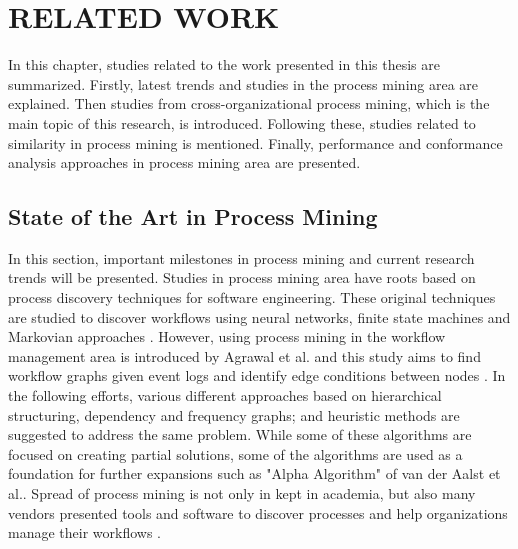 \chapter{RELATED WORK}
\label{chp:relatedwork}

In this chapter, studies related to the work presented in this thesis are summarized. Firstly, latest trends and studies in the process mining area are explained. Then studies from cross-organizational process mining, which is the main topic of this research, is introduced. Following these, studies related to similarity in process mining is mentioned. Finally, performance and conformance analysis approaches in process mining area are presented.

\section{State of the Art in Process Mining}
\label{sec:state-of-the-art-in-process-mining}

In this section, important milestones in process mining and current research trends will be presented. Studies in process mining area have roots based on process discovery techniques for software engineering. These original techniques are studied to discover workflows using neural networks, finite state machines and Markovian approaches \cite{van2004process}. However, using process mining in the workflow management area is introduced by Agrawal et al. and this study aims to find workflow graphs given event logs and identify edge conditions between nodes \cite{agrawal1998mining}. In the following efforts, various different approaches based on hierarchical structuring, dependency and frequency graphs; and heuristic methods are suggested to address the same problem. While some of these algorithms are focused on creating partial solutions, some of the algorithms are used as a foundation for further expansions such as "Alpha Algorithm" of van der Aalst et al.\cite{van2004workflow}. Spread of process mining is not only in kept in academia, but also many vendors presented tools and software to discover processes and help organizations manage their workflows \cite{accorsi2014unleashing}.

